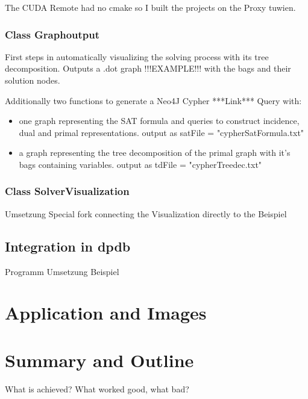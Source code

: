 \documentclass[a4paper, 12pt]{scrartcl}
\begin{document}
The CUDA Remote had no cmake so I built the projects on the Proxy tuwien.

\subsubsection{Class Graphoutput}
First steps in automatically visualizing the solving process with its tree decomposition.
Outputs a .dot graph !!!EXAMPLE!!! with the bags and their solution nodes.

Additionally two functions to generate a Neo4J Cypher ***Link*** Query with:
\begin{itemize}
	\item one graph representing the SAT formula and  queries to construct incidence, dual and primal representations.
	output as satFile = "cypherSatFormula.txt"
	\item a graph representing the tree decomposition of the primal graph with it's bags containing variables.
	output as tdFile = "cypherTreedec.txt"
\end{itemize}
\subsubsection{Class SolverVisualization}

Umsetzung Special fork connecting the Visualization directly to the 
Beispiel
\newpage
\subsection{Integration in dpdb}
Programm
Umsetzung
Beispiel

\newpage
\section{Application and Images }

\newpage
\section{Summary and Outline}
What is achieved?
What worked good, what bad?
{}

\end{document}
